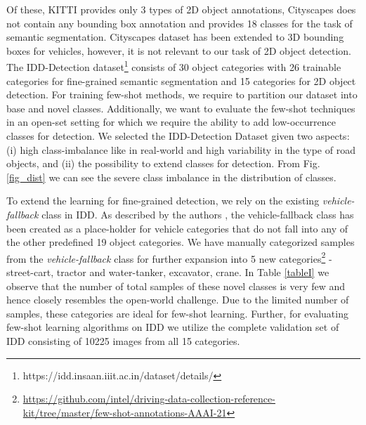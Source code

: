 \documentclass[letterpaper]{article} %
\begin{document}
Of these, KITTI provides only 3 types of 2D object annotations, Cityscapes does not contain any bounding box annotation and provides 18 classes for the task of semantic segmentation. Cityscapes dataset has been extended to 3D bounding boxes for vehicles, however, it is not relevant to our task of 2D object detection. The IDD-Detection dataset\footnote{https://idd.insaan.iiit.ac.in/dataset/details/} consists of 30 object categories with 26 trainable categories for fine-grained semantic segmentation and 15 categories for 2D object detection. For training few-shot methods, we require to partition our dataset into base and novel classes. Additionally, we want to evaluate the few-shot techniques in an open-set setting for which we require the ability to add low-occurrence classes for detection. We selected the IDD-Detection Dataset given two aspects: (i) high class-imbalance like in real-world and high variability in the type of road objects, and (ii) the possibility to extend classes for detection. From Fig. \ref{fig_dist} we can see the severe class imbalance in the distribution of classes.

To extend the learning for fine-grained detection, we rely on the existing  \emph{vehicle-fallback} class in IDD. As described by the authors \cite{idd}, the vehicle-fallback class has been created as a place-holder for vehicle categories that do not fall into any of the other predefined 19 object categories. We have manually categorized samples from the \emph{vehicle-fallback} class for further expansion into 5 new categories\footnote{\url{https://github.com/intel/driving-data-collection-reference-kit/tree/master/few-shot-annotations-AAAI-21}} -  street-cart, tractor and water-tanker, excavator, crane. In Table \ref{tableI} we observe that the number of total samples of these novel classes is very few and hence closely resembles the open-world challenge. Due to the limited number of samples, these categories are ideal for few-shot learning. Further, for evaluating few-shot learning algorithms on IDD we utilize the complete validation set of IDD consisting of 10225 images from all 15 categories.
\end{document}
